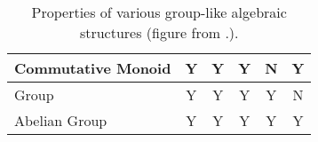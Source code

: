 \begin{table}[H]
\begin{tabularx}{\textwidth}{|X|c|c|c|c|c|}
Commutative Monoid            & \cellcolor[HTML]{D9EAD3}Y  & \cellcolor[HTML]{D9EAD3}Y  & \cellcolor[HTML]{D9EAD3}Y  & \cellcolor[HTML]{F4CCCC}N  & \cellcolor[HTML]{D9EAD3}Y  \\ \hline
Group                         & \cellcolor[HTML]{D9EAD3}Y  & \cellcolor[HTML]{D9EAD3}Y  & \cellcolor[HTML]{D9EAD3}Y  & \cellcolor[HTML]{D9EAD3}Y  & \cellcolor[HTML]{F4CCCC}N  \\ \hline
Abelian Group                 & \cellcolor[HTML]{D9EAD3}Y  & \cellcolor[HTML]{D9EAD3}Y  & \cellcolor[HTML]{D9EAD3}Y  & \cellcolor[HTML]{D9EAD3}Y  & \cellcolor[HTML]{D9EAD3}Y  \\ \hline
\end{tabularx}
\caption{Properties of various group-like algebraic structures (figure from \autocite{group_like_table}.).}
\label{fig:properties-of-groups-table}
\end{table}
